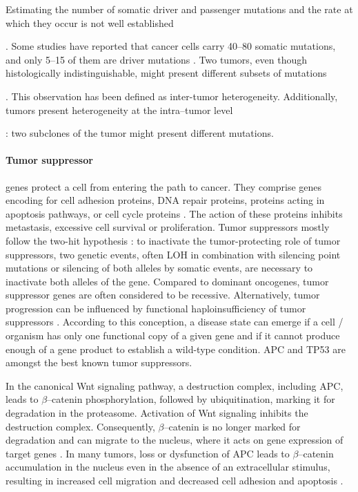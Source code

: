     Estimating the number of somatic driver and passenger mutations and the rate
    at which they occur is not well established {\cite{driver_passenger}. Some
    studies have reported that cancer cells carry 40--80 somatic mutations, and
    only 5--15 of them are driver mutations {\cite{som_mut}}. Two tumors, even
    though histologically indistinguishable, might present different subsets of
    mutations {\cite{driver_passenger} {\cite{intertumor}}. This observation has
    been defined as inter-tumor heterogeneity. Additionally, tumors present
    heterogeneity at the intra--tumor level {\cite{intratumor}: two subclones of
    the tumor might present different mutations.

    \paragraph{Tumor suppressor} genes protect a cell from entering the path to
    cancer. They comprise genes encoding for cell adhesion proteins, DNA repair
    proteins, proteins acting in apoptosis pathways, or cell cycle proteins
    {\cite{tumor_supp}}. The action of these proteins inhibits metastasis,
    excessive cell survival or proliferation. Tumor suppressors mostly follow
    the two-hit hypothesis {\cite{two_hit}}: to inactivate the tumor-protecting
    role of tumor suppressors, two genetic events, often LOH in combination
    with silencing point mutations or silencing of both alleles by somatic
    events, are necessary to inactivate both alleles of the gene. Compared to
    dominant oncogenes, tumor suppressor genes are often considered to be
    recessive. Alternatively, tumor progression can be influenced by functional
    haploinsufficiency of tumor suppressors {\cite{haploinsuff}}. According to
    this conception, a disease state can emerge if a cell / organism has only
    one functional copy of a given gene and if it cannot produce enough of a
    gene product to establish a wild-type condition. APC and TP53 are amongst
    the best known tumor suppressors.

    In the canonical Wnt signaling pathway, a destruction complex, including
    APC, leads to $\beta$--catenin phosphorylation, followed by ubiquitination,
    marking it for degradation in the proteasome. Activation of Wnt signaling
    inhibits the destruction complex.  Consequently, $\beta$--catenin is no
    longer marked for degradation and can migrate to the nucleus, where it
    acts on gene expression of target genes {\cite{wnt_signal}}. In many tumors,
    loss or dysfunction of APC leads to $\beta$--catenin accumulation in the
    nucleus even in the absence of an extracellular stimulus, resulting in
    increased cell migration and decreased cell adhesion and apoptosis
    {\cite{wnt_signal_2}}.

}}}
